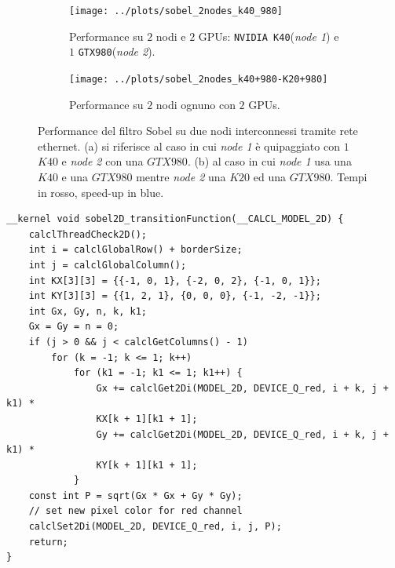 \begin{figure}[!htb]
	\begin{subfigure}{1.0\textwidth}
		\caption{Performance su $2$ nodi e $2$ GPUs: \texttt{NVIDIA K40}(\textit{node 1}) e $1$ \texttt{GTX980}(\textit{node 2}).}
		\label{fig:sobel_2nodes_k40_980}
		\texttt{[image: ../plots/sobel\_2nodes\_k40\_980]}
		
	\end{subfigure}        
	\endminipage \hfill
	\vspace{5mm}
	\begin{subfigure}{1.0\textwidth}
		\texttt{[image: ../plots/sobel\_2nodes\_k40+980-K20+980]}
		\caption{Performance su $2$ nodi ognuno con $2$ GPUs.}
		\label{fig:sobel_2nodes_k40+980-K20+980}
	\end{subfigure}
	\endminipage\hfill
	\caption[Performance del benchmark \textit{Sobel}  su due nodi.]{Performance del filtro Sobel su due nodi interconnessi tramite rete ethernet. (a) si riferisce al caso in cui \textit{node 1} è quipaggiato con $1$ $K40$ e \textit{node 2} con una $GTX980$. (b) al caso in cui \textit{node 1} usa una $K40$ e una $GTX980$ mentre \textit{node 2} una $K20$ ed una $GTX980$. Tempi in rosso, speed-up in blue.}
	\label{fig:sobel_2nodes_performance}
\end{figure}
\begin{minipage}{1.0\textwidth}


\begin{lstlisting}
__kernel void sobel2D_transitionFunction(__CALCL_MODEL_2D) {
	calclThreadCheck2D();
	int i = calclGlobalRow() + borderSize;
	int j = calclGlobalColumn();
	int KX[3][3] = {{-1, 0, 1}, {-2, 0, 2}, {-1, 0, 1}};
	int KY[3][3] = {{1, 2, 1}, {0, 0, 0}, {-1, -2, -1}};
	int Gx, Gy, n, k, k1;
	Gx = Gy = n = 0;
	if (j > 0 && j < calclGetColumns() - 1)
		for (k = -1; k <= 1; k++)
			for (k1 = -1; k1 <= 1; k1++) {
				Gx += calclGet2Di(MODEL_2D, DEVICE_Q_red, i + k, j + k1) *
				KX[k + 1][k1 + 1];
				Gy += calclGet2Di(MODEL_2D, DEVICE_Q_red, i + k, j + k1) *
				KY[k + 1][k1 + 1];
			}
	const int P = sqrt(Gx * Gx + Gy * Gy);
	// set new pixel color for red channel
	calclSet2Di(MODEL_2D, DEVICE_Q_red, i, j, P);
	return;
}
\end{lstlisting}
\end{minipage}